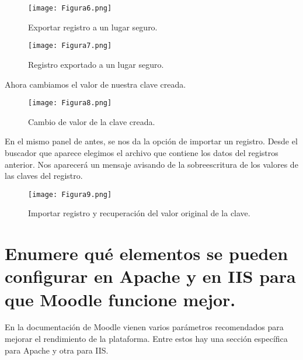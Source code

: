 \begin{figure}[H] 
\centering
\texttt{[image: Figura6.png]}  
\caption{Exportar registro a un lugar seguro.}\label{fig:figura6}
\end{figure}
\begin{figure}[H] 
\centering
\texttt{[image: Figura7.png]}  
\caption{Registro exportado a un lugar seguro.}\label{fig:figura7}
\end{figure}

Ahora cambiamos el valor de nuestra clave creada.

\begin{figure}[H] 
\centering
\texttt{[image: Figura8.png]}  
\caption{Cambio de valor de la clave creada.}\label{fig:figura8}
\end{figure}

En el mismo panel de antes, se nos da la opción de importar un registro. Desde el buscador que aparece elegimos el 
archivo que contiene los datos del registros anterior. Nos aparecerá un mensaje avisando de la sobreescritura de los valores de
las claves del registro.

\begin{figure}[H] 
\centering
\texttt{[image: Figura9.png]}  
\caption{Importar registro y recuperación del valor original de la clave.}\label{fig:figura9}
\end{figure}


\vspace{5mm}


\section{Enumere qué elementos se pueden configurar en Apache y en IIS para que Moodle funcione mejor.}

En la documentación\cite{moodle} de Moodle vienen varios parámetros recomendados para mejorar el rendimiento
de la plataforma. Entre estos hay una sección específica para Apache y otra para IIS.

